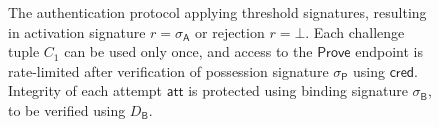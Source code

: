\documentclass[a4paper]{article}
\begin{document}
\begin{figure}[t]
\caption{The authentication protocol applying threshold signatures, resulting in activation signature $r=\sigma_\mathsf A$ or rejection $r=\bot$. Each challenge tuple $C_1$ can be used only once, and access to the $\mathsf{Prove}$ endpoint is rate-limited after verification of possession signature $\sigma_\mathsf P$ using $\mathsf{cred}$. Integrity of each attempt $\mathsf{att}$ is protected using binding signature $\sigma_\mathsf B$, to be verified using $D_\mathsf B$.}
\label{fig:protocol}
\end{figure}
\end{document}

